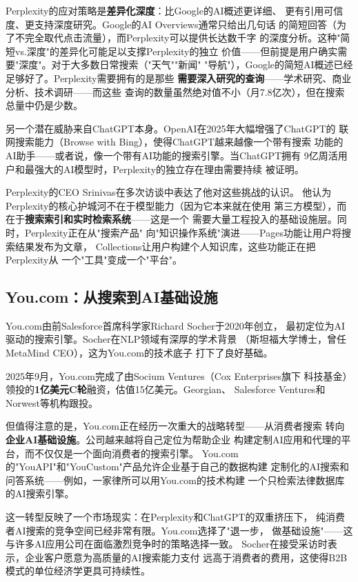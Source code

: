 Perplexity的应对策略是\textbf{差异化深度}：比Google的AI概述更详细、
更有引用可信度、更支持深度研究。Google的AI Overviews通常只给出几句话
的简短回答（为了不完全取代点击流量），而Perplexity可以提供长达数千字
的深度分析。这种"简短vs.深度"的差异化可能足以支撑Perplexity的独立
价值——但前提是用户确实需要"深度"。对于大多数日常搜索（"天气""新闻"
"导航"），Google的简短AI概述已经足够好了。Perplexity需要拥有的是那些
\textbf{需要深入研究的查询}——学术研究、商业分析、技术调研——而这些
查询的数量虽然绝对值不小（月7.8亿次），但在搜索总量中仍是少数。

另一个潜在威胁来自ChatGPT本身。OpenAI在2025年大幅增强了ChatGPT的
联网搜索能力（Browse with Bing），使得ChatGPT越来越像一个带有搜索
功能的AI助手——或者说，像一个带有AI功能的搜索引擎。当ChatGPT拥有
9亿周活用户和最强大的AI模型时，Perplexity的独立存在理由需要持续
被证明。

Perplexity的CEO Srinivas在多次访谈中表达了他对这些挑战的认识。
他认为Perplexity的核心护城河不在于模型能力（因为它本来就在使用
第三方模型），而在于\textbf{搜索索引和实时检索系统}——这是一个
需要大量工程投入的基础设施层。同时，Perplexity正在从"搜索产品"
向"知识操作系统"演进——Pages功能让用户将搜索结果发布为文章，
Collections让用户构建个人知识库，这些功能正在把Perplexity从
一个"工具"变成一个"平台"。

\subsection{You.com：从搜索到AI基础设施}
\label{subsec:youcom}

You.com由前Salesforce首席科学家Richard Socher于2020年创立，
最初定位为AI驱动的搜索引擎。Socher在NLP领域有深厚的学术背景
（斯坦福大学博士，曾任MetaMind CEO），这为You.com的技术底子
打下了良好基础。

2025年9月，You.com完成了由Socium Ventures（Cox Enterprises旗下
科技基金）领投的\textbf{1亿美元C轮}融资，估值15亿美元。Georgian、
Salesforce Ventures和Norwest等机构跟投。

但值得注意的是，You.com正在经历一次重大的战略转型——从消费者搜索
转向\textbf{企业AI基础设施}。公司越来越将自己定位为帮助企业
构建定制AI应用和代理的平台，而不仅仅是一个面向消费者的搜索引擎。
You.com的"YouAPI"和"YouCustom"产品允许企业基于自己的数据构建
定制化的AI搜索和问答系统——例如，一家律所可以用You.com的技术构建
一个只检索法律数据库的AI搜索引擎。

这一转型反映了一个市场现实：在Perplexity和ChatGPT的双重挤压下，
纯消费者AI搜索的竞争空间已经非常有限。You.com选择了"退一步，
做基础设施"——这与许多AI应用公司在面临激烈竞争时的策略选择一致。
Socher在接受采访时表示，企业客户愿意为高质量的AI搜索能力支付
远高于消费者的费用，这使得B2B模式的单位经济学更具可持续性。

